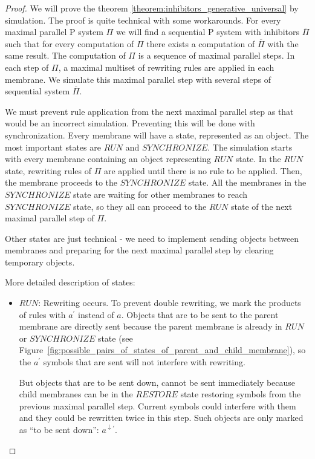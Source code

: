 


\begin{proof}
  We will prove the theorem \ref{theorem:inhibitors_generative_universal} by simulation.
  The proof is quite technical with some workarounds.
  For every maximal parallel P system $\Pi$ we will find a sequential P system with inhibitors $\overline{\Pi}$ such that for every computation of $\Pi$ there exists a computation of $\overline{\Pi}$ with the same result.
  The computation of $\Pi$ is a sequence of maximal parallel steps.
  In each step of $\Pi$, a maximal multiset of rewriting rules are applied in each membrane.
  We simulate this maximal parallel step with several steps of sequential system $\overline{\Pi}$.

  We must prevent rule application from the next maximal parallel step as that would be an incorrect simulation.
  Preventing this will be done with synchronization.
  Every membrane will have a state, represented as an object.
  The most important states are $RUN$ and $SYNCHRONIZE$.
  The simulation starts with every membrane containing an object representing $RUN$ state.
  In the $RUN$ state, rewriting rules of $\Pi$ are applied until there is no rule to be applied. Then, the membrane proceeds to the $SYNCHRONIZE$ state.
  All the membranes in the $SYNCHRONIZE$ state are waiting for other membranes to reach $SYNCHRONIZE$ state, so they all can proceed to the $RUN$ state of the next maximal parallel step of $\Pi$.

  Other states are just technical - we need to implement sending objects between membranes and preparing for the next maximal parallel step by clearing temporary objects.

  More detailed description of states:
  

  \begin{itemize}
    \item $RUN$: Rewriting occurs.
    To prevent double rewriting, we mark the products of rules with $a^{\prime}$ instead of $a$.
    Objects that are to be sent to the parent membrane are directly sent because the parent membrane is already in $RUN$ or $SYNCHRONIZE$ state (see Figure~\ref{fig:possible_pairs_of_states_of_parent_and_child_membrane}), so the $a^{\prime}$ symbols that are sent will not interfere with rewriting.
    
    But objects that are to be sent down, cannot be sent immediately because child membranes can be in the $RESTORE$ state restoring symbols from the previous maximal parallel step. Current symbols could interfere with them and they could be rewritten twice in this step. Such objects are only marked as ``to be sent down'': $a^{\downarrow\prime}$.


\end{itemize}
\end{proof}
